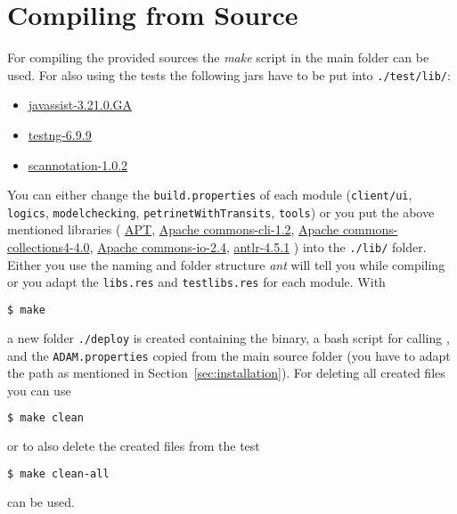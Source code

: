 \documentclass[12pt,twoside,a4paper,openright]{memoir}
\begin{document}
\section{Compiling from Source}
For compiling the provided sources the \emph{make} script in the main folder can be used.
For also using the tests the following jars have to be put into \texttt{./test/lib/}:
\begin{itemize}
\item \href{https://github.com/jboss-javassist/javassist}{javassist-3.21.0.GA}
\item \href{https://github.com/cbeust/testng}{testng-6.9.9}
\item \href{http://scannotation.sourceforge.net/}{scannotation-1.0.2}
\end{itemize}
%
You can either change the \texttt{build.properties} of each module
(\texttt{client/ui}, \texttt{logics}, \texttt{modelchecking}, \texttt{petrinetWithTransits}, \texttt{tools})
or you put the above mentioned libraries
(%
\href{https://github.com/CvO-Theory/apt/}{APT},
\href{https://commons.apache.org/proper/commons-cli/}{Apache commons-cli-1.2},
\href{https://commons.apache.org/proper/commons-collections/}{Apache commons-collections4-4.0},
\href{https://commons.apache.org/proper/commons-io/}{Apache commons-io-2.4},
\href{https://www.antlr.org/}{antlr-4.5.1}%
) into the \texttt{./lib/} folder.
Either you use the naming and folder structure \emph{ant} will tell you while compiling or you adapt the \texttt{libs.res} 
and \texttt{testlibs.res} for each module.
%
With
\begin{lstlisting}[language=bash]
$ make
\end{lstlisting}
a new folder \texttt{./deploy} is created containing the binary, a bash script for calling \tool{}, and the \texttt{ADAM.properties}
copied from the main source folder (you have to adapt the path as mentioned in Section~\ref{sec:installation}).
For deleting all created files you can use
\begin{lstlisting}[language=bash]
$ make clean
\end{lstlisting}
or to also delete the created files from the test
\begin{lstlisting}[language=bash]
$ make clean-all
\end{lstlisting}
can be used.
\end{document}

